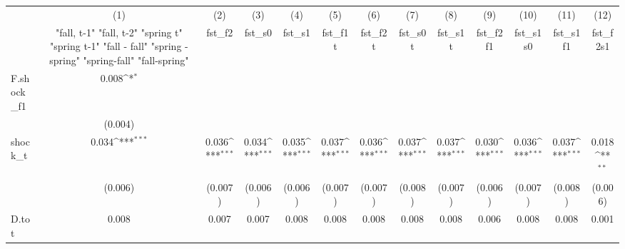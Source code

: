 {
\def\sym#1{\ifmmode^{#1}\else\(^{#1}\)\fi}
\begin{tabular}{l*{12}{c}}
\toprule
            &\multicolumn{1}{c}{(1)}&\multicolumn{1}{c}{(2)}&\multicolumn{1}{c}{(3)}&\multicolumn{1}{c}{(4)}&\multicolumn{1}{c}{(5)}&\multicolumn{1}{c}{(6)}&\multicolumn{1}{c}{(7)}&\multicolumn{1}{c}{(8)}&\multicolumn{1}{c}{(9)}&\multicolumn{1}{c}{(10)}&\multicolumn{1}{c}{(11)}&\multicolumn{1}{c}{(12)}\\
            &\multicolumn{1}{c}{  "fall, t-1" "fall, t-2" "spring t" "spring t-1"  "fall - fall" "spring - spring" "spring-fall" "fall-spring" }&\multicolumn{1}{c}{fst\_f2}&\multicolumn{1}{c}{fst\_s0}&\multicolumn{1}{c}{fst\_s1}&\multicolumn{1}{c}{fst\_f1t}&\multicolumn{1}{c}{fst\_f2t}&\multicolumn{1}{c}{fst\_s0t}&\multicolumn{1}{c}{fst\_s1t}&\multicolumn{1}{c}{fst\_f2f1}&\multicolumn{1}{c}{fst\_s1s0}&\multicolumn{1}{c}{fst\_s1f1}&\multicolumn{1}{c}{fst\_f2s1}\\
\midrule
F.shock\_f1  &       0.008\sym{*}  &                     &                     &                     &                     &                     &                     &                     &                     &                     &                     &                     \\
            &     (0.004)         &                     &                     &                     &                     &                     &                     &                     &                     &                     &                     &                     \\
\addlinespace
shock\_t     &       0.034\sym{***}&       0.036\sym{***}&       0.034\sym{***}&       0.035\sym{***}&       0.037\sym{***}&       0.036\sym{***}&       0.037\sym{***}&       0.037\sym{***}&       0.030\sym{***}&       0.036\sym{***}&       0.037\sym{***}&       0.018\sym{**} \\
            &     (0.006)         &     (0.007)         &     (0.006)         &     (0.006)         &     (0.007)         &     (0.007)         &     (0.008)         &     (0.007)         &     (0.006)         &     (0.007)         &     (0.008)         &     (0.006)         \\
\addlinespace
D.tot       &       0.008         &       0.007         &       0.007         &       0.008         &       0.008         &       0.008         &       0.008         &       0.008         &       0.006         &       0.008         &       0.008         &       0.001         \\

\end{tabular}}
